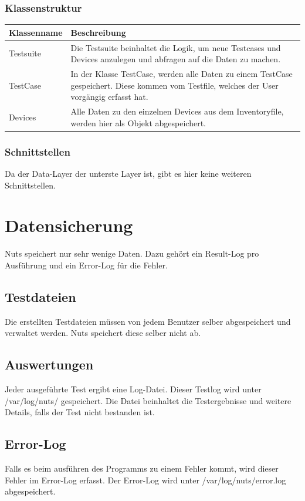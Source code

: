 \documentclass[a4,12pt]{scrartcl}
\begin{document}
\subsubsection{Klassenstruktur}
\begin{table}[H]
\centering
    \begin{tabular}{@{}l p{11cm} @{}}\toprule    
    {Klassenname} & {Beschreibung}\\ \midrule
    
    Testsuite & Die Testsuite beinhaltet die Logik, um neue Testcases und Devices anzulegen und abfragen auf die Daten zu machen.\\     
    TestCase & In der Klasse TestCase, werden alle Daten zu einem TestCase gespeichert. Diese kommen vom Testfile, welches der User vorgängig erfasst hat.\\         
    Devices & Alle Daten zu den einzelnen Devices aus dem Inventoryfile, werden hier als Objekt abgespeichert.\\
  
    \bottomrule
    \end{tabular}
\end{table}
\subsubsection{Schnittstellen}
Da der Data-Layer der unterste Layer ist, gibt es hier keine weiteren Schnittstellen.







\newpage
\section{Datensicherung}
Nuts speichert nur sehr wenige Daten. Dazu gehört ein Result-Log pro Ausführung und ein Error-Log für die Fehler.
\subsection{Testdateien}
Die erstellten Testdateien müssen von jedem Benutzer selber abgespeichert und verwaltet werden. Nuts speichert diese selber nicht ab.
\subsection{Auswertungen}
Jeder ausgeführte Test ergibt eine Log-Datei. Dieser Testlog wird unter /var/log/nuts/ gespeichert. Die Datei beinhaltet die Testergebnisse und weitere Details, falls der Test nicht bestanden ist.
\subsection{Error-Log}
Falls es beim ausführen des Programms zu einem Fehler kommt, wird dieser Fehler im Error-Log erfasst. Der Error-Log wird unter /var/log/nuts/error.log abgespeichert.
\end{document}
